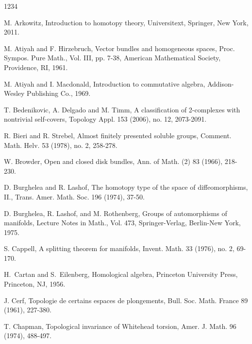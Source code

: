 \documentclass[12pt]{amsart}
\theoremstyle{plain}
\theoremstyle{definition}
\theoremstyle{question}
\theoremstyle{remark}
\theoremstyle{assumption}
\numberwithin{equation}{section}
\theoremstyle{bigthm}
\begin{document}
\begin{thebibliography}{1234}

 M. Arkowitz, Introduction to homotopy theory, Universitext, Springer, New York, 2011.

 M. Atiyah and F. Hirzebruch, Vector bundles and homogeneous spaces, Proc. Sympos. Pure Math., Vol. III, pp. 7-38, American Mathematical Society, Providence, RI, 1961.

 M. Atiyah and I. Macdonald, Introduction to commutative algebra, Addison-Wesley Publishing Co., 1969.

 T. Bedenikovic, A. Delgado and M. Timm, A classification of 2-complexes with nontrivial self-covers, Topology Appl. 153 (2006), no. 12, 2073-2091.

 R. Bieri and R. Strebel, Almost finitely presented soluble groups, Comment. Math. Helv. 53 (1978), no. 2, 258-278.

 W. Browder, Open and closed disk bundles, Ann. of Math. (2) 83 (1966), 218-230.

 D. Burghelea and R. Lashof, The homotopy type of the space of diffeomorphisms, II., Trans. Amer. Math. Soc. 196 (1974), 37-50.

 D. Burghelea, R. Lashof, and M. Rothenberg, Groups of automorphisms of manifolds, Lecture Notes in Math., Vol. 473, Springer-Verlag, Berlin-New York, 1975.

 S. Cappell, A splitting theorem for manifolds, Invent. Math. 33 (1976), no. 2, 69-170.

 H.~Cartan and S.~Eilenberg, Homological algebra, Princeton University Press, Princeton, NJ, 1956.

 J. Cerf, Topologie de certains espaces de plongements, Bull. Soc. Math. France 89 (1961), 227-380.

 T. Chapman, Topological invariance of Whitehead torsion, Amer. J. Math. 96 (1974), 488-497.


\end{thebibliography}
\end{document}
